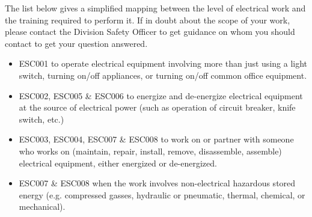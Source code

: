 \documentclass[10pt]{article}
\begin{document}
The list below gives a simplified mapping between the level of electrical work and the training required to perform it. If in doubt about the scope of your work, please contact the Division Safety Officer to get guidance on whom you should contact to get your question answered.
\vspace{-\parskip}
\begin{itemize}
\item ESC001\hfill\break
to operate electrical equipment involving more than just using a light switch, turning on/off appliances, or turning on/off common office equipment.
\item ESC002, ESC005 \& ESC006\hfill\break
to energize and de-energize electrical equipment at the source of electrical power (such as operation of circuit breaker, knife switch, etc.)
\item  ESC003, ESC004, ESC007 \& ESC008\hfill\break
to work on or partner with someone who works on (maintain, repair, install, remove, disassemble, assemble) electrical equipment, either energized or de-energized.
\item ESC007 \& ESC008\hfill\break
when the work involves non-electrical hazardous stored energy (e.g. compressed gasses, hydraulic or pneumatic, thermal, chemical, or mechanical).
\end{itemize}

\end{document}
